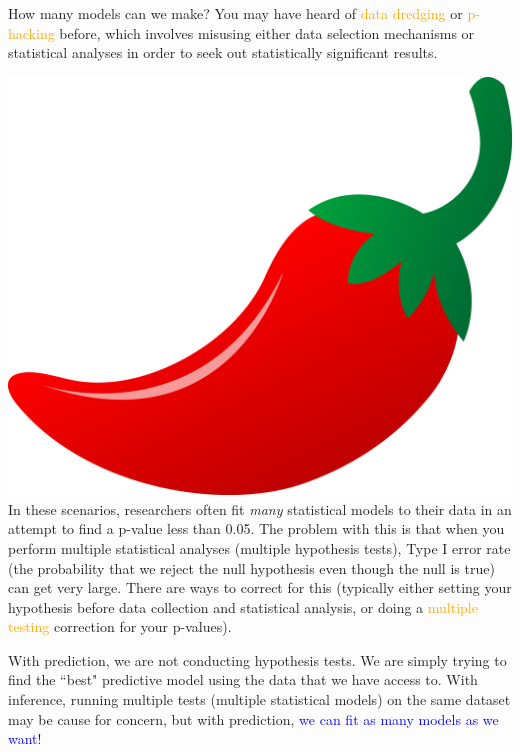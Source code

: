 \documentclass[10pt,t]{beamer}
\begin{document}
\begin{frame}{How many models can we make?}
\vspace{-0.5cm}
You may have heard of \textcolor{orange}{data dredging} or \textcolor{orange}{p-hacking} before, which involves misusing either data selection mechanisms or statistical analyses in order to seek out statistically significant results.

\vspace{0.3cm}

\includegraphics[scale=0.01]{figures/chilipepper.png} In these scenarios, researchers often fit \textit{many} statistical models to their data in an attempt to find a p-value less than 0.05. The problem with this is that when you perform multiple statistical analyses (multiple hypothesis tests), Type I error rate (the probability that we reject the null hypothesis even though the null is true) can get very large. There are ways to correct for this (typically either setting your hypothesis before data collection and statistical analysis, or doing a \textcolor{orange}{multiple testing} correction for your p-values). 

\vspace{0.3cm}

With prediction, we are not conducting hypothesis tests. We are simply trying to find the ``best" predictive model using the data that we have access to. With inference, running multiple tests (multiple statistical models) on the same dataset may be cause for concern, but with prediction, \textcolor{blue}{we can fit as many models as we want!}

\end{frame}
\end{document}
